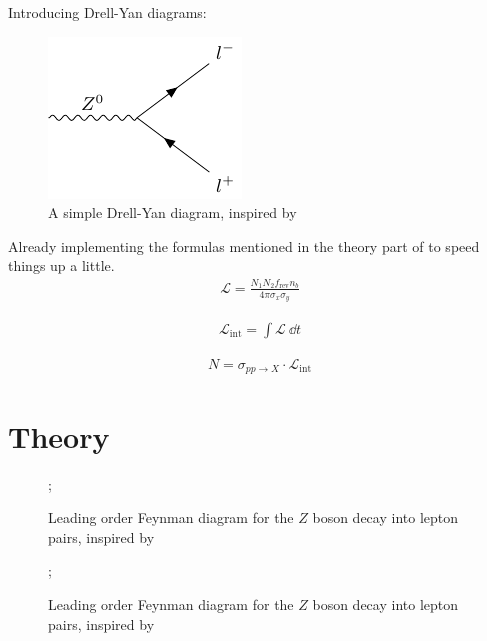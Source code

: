 \documentclass[twocolumn,
			   showpacs,%
               nofootinbib,
               aps,%
               prd,
               notitlepage,
               showkeys,
               10pt]{revtex4-1}
\begin{document}
Introducing Drell-Yan diagrams:
\begin{figure}[H]
\centering
\includegraphics{feynman-diagrams/F91_report-figure1}
\caption{A simple Drell-Yan diagram, inspired by \cite{F91manual}}
\end{figure}

Already implementing the formulas mentioned in the theory part of \cite{F91manual} to speed things up a little.
\begin{align}
\mathcal{L} = \frac{N_1N_2f_{\text{rev}}n_b}{4\pi\sigma_x\sigma_y}
\end{align}

\blindtext

\begin{align}
\mathcal{L}_{\text{int}} = \int \mathcal{L} \ \dd t	
\end{align}

\blindtext

\begin{align}
N = \sigma_{pp\rightarrow X} \cdot \mathcal{L}_{\text{int}}
\end{align}


\section{Theory}


\begin{figure}[H]
\centering
	
;

\caption{Leading order Feynman diagram for the $Z$ boson decay into lepton pairs, inspired by \cite{PPMasterclass}}
\end{figure}


\begin{figure}[H]
\centering
	
;

\caption{Leading order Feynman diagram for the $Z$ boson decay into lepton pairs, inspired by \cite{PPMasterclass}}
\end{figure}
\end{document}
